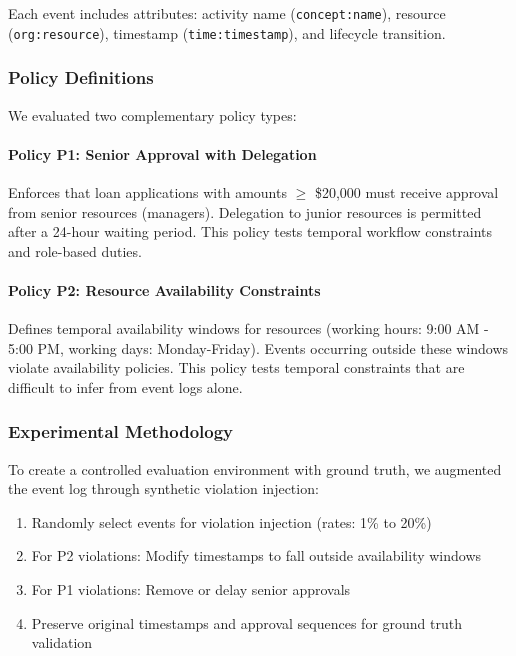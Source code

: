 Each event includes attributes: activity name (\texttt{concept:name}), resource (\texttt{org:resource}), timestamp (\texttt{time:timestamp}), and lifecycle transition.

\subsubsection{Policy Definitions}

We evaluated two complementary policy types:

\paragraph{Policy P1: Senior Approval with Delegation}
Enforces that loan applications with amounts $\geq$ \$20,000 must receive approval from senior resources (managers). Delegation to junior resources is permitted after a 24-hour waiting period. This policy tests temporal workflow constraints and role-based duties.

\paragraph{Policy P2: Resource Availability Constraints}
Defines temporal availability windows for resources (working hours: 9:00 AM - 5:00 PM, working days: Monday-Friday). Events occurring outside these windows violate availability policies. This policy tests temporal constraints that are difficult to infer from event logs alone.

\subsubsection{Experimental Methodology}

To create a controlled evaluation environment with ground truth, we augmented the event log through synthetic violation injection:

\begin{enumerate}
    \item Randomly select events for violation injection (rates: 1\% to 20\%)
    \item For P2 violations: Modify timestamps to fall outside availability windows
    \item For P1 violations: Remove or delay senior approvals
    \item Preserve original timestamps and approval sequences for ground truth validation
\end{enumerate}

